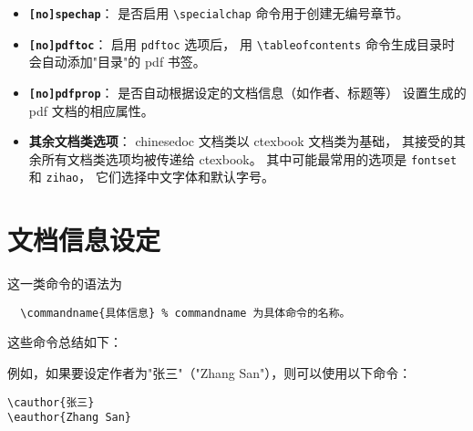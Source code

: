 \begin{itemize}
    \item \textbf{\texttt{[no]spechap}}：
        是否启用 \verb|\specialchap| 命令用于创建无编号章节。

    \item \textbf{\texttt{[no]pdftoc}}：
        启用 \verb|pdftoc| 选项后，
        用 \verb|\tableofcontents| 命令生成目录时会自动添加"目录"的 pdf 书签。

    \item \textbf{\texttt{[no]pdfprop}}：
        是否自动根据设定的文档信息（如作者、标题等）
        设置生成的 pdf 文档的相应属性。

    \item \textbf{其余文档类选项}：%
        chinesedoc 文档类以 ctexbook 文档类为基础，
        其接受的其余所有文档类选项均被传递给 ctexbook。
        其中可能最常用的选项是 \verb|fontset| 和 \verb|zihao|，
        它们选择中文字体和默认字号。
\end{itemize}

\section{文档信息设定}
\label{sec:info}

这一类命令的语法为
\begin{Verbatim}
  \commandname{具体信息} % commandname 为具体命令的名称。
\end{Verbatim}

这些命令总结如下：

例如，如果要设定作者为"张三"（"Zhang San"），则可以使用以下命令：
\begin{Verbatim}
\cauthor{张三}
\eauthor{Zhang San}
\end{Verbatim}


